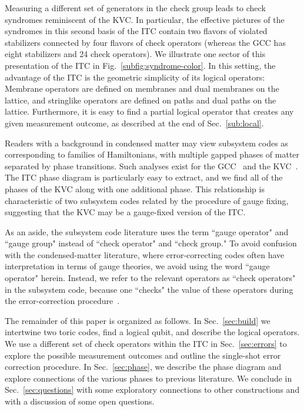 Measuring a different set of generators in the check group leads to check syndromes reminiscent of the KVC. In particular, the effective pictures of the syndromes in this second basis of the ITC contain two flavors of violated stabilizers connected by four flavors of check operators (whereas the GCC has eight stabilizers and 24 check operators). We illustrate one sector of this presentation of the ITC in Fig.~\ref{subfig:syndrome-color}. In this setting, the advantage of the ITC is the geometric simplicity of its logical operators: Membrane operators are defined on membranes and dual membranes on the lattice, and stringlike operators are defined on paths and dual paths on the lattice.
Furthermore, it is easy to find a partial logical operator that creates any given measurement outcome, as described at the end of Sec.~\ref{sub:local}.

Readers with a background in condensed matter may view subsystem codes as corresponding to families of Hamiltonians, with multiple gapped phases of matter separated by phase transitions. Such analyses exist for the GCC~\cite{Kubica2018Ungauging} and the KVC~\cite{Li2023PhaseDiagram}. The ITC phase diagram is particularly easy to extract, and we find all of the phases of the KVC along with one additional phase. This relationship is characteristic of two subsystem codes related by the procedure of gauge fixing, suggesting that the KVC may be a gauge-fixed version of the ITC.

As an aside, the subsystem code literature uses the term ``gauge operator" and ``gauge group" instead of ``check operator" and ``check group." To avoid confusion with the condensed-matter literature, where error-correcting codes often have interpretation in terms of gauge theories, we avoid using the word ``gauge operator" herein. Instead, we refer to the relevant operators as ``check operators" in the subsystem code, because one ``checks" the value of these operators during the error-correction procedure~\cite{HastingsHaah2021}.

The remainder of this paper is organized as follows. In Sec.~\ref{sec:build} we intertwine two toric codes, find a logical qubit, and describe the logical operators. We use a different set of check operators within the ITC in Sec.~\ref{sec:errors} to explore the possible measurement outcomes and outline the single-shot error correction procedure. In Sec.~\ref{sec:phase}, we describe the phase diagram and explore connections of the various phases to previous literature. We conclude in Sec.~\ref{sec:questions} with some exploratory connections to other constructions and with a discussion of some open questions.

